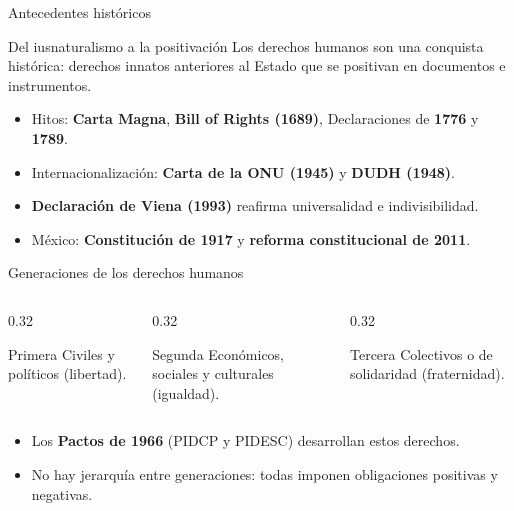 \documentclass[
  spanish,
  aspectratio=169,
  xcolor={dvipsnames,table}
]{beamer}
\begin{document}
\begin{frame}{Antecedentes históricos}
  \begin{block}{Del iusnaturalismo a la positivación}
    Los derechos humanos son una conquista histórica: derechos innatos anteriores al Estado que se positivan en documentos e instrumentos.
  \end{block}
  \begin{itemize}
    \item Hitos: \textbf{Carta Magna}, \textbf{Bill of Rights (1689)}, Declaraciones de \textbf{1776} y \textbf{1789}.
    \item Internacionalización: \textbf{Carta de la ONU (1945)} y \textbf{DUDH (1948)}.
    \item \textbf{Declaración de Viena (1993)} reafirma universalidad e indivisibilidad.
    \item México: \textbf{Constitución de 1917} y \textbf{reforma constitucional de 2011}.
  \end{itemize}
\end{frame}

\begin{frame}{Generaciones de los derechos humanos}
  \begin{columns}[T]
    \begin{column}{0.32\linewidth}
      \begin{block}{Primera}
        Civiles y políticos (libertad).
      \end{block}
    \end{column}
    \begin{column}{0.32\linewidth}
      \begin{block}{Segunda}
        Económicos, sociales y culturales (igualdad).
      \end{block}
    \end{column}
    \begin{column}{0.32\linewidth}
      \begin{block}{Tercera}
        Colectivos o de solidaridad (fraternidad).
      \end{block}
    \end{column}
  \end{columns}
  \vspace{0.25cm}
  \begin{itemize}
    \item Los \textbf{Pactos de 1966} (PIDCP y PIDESC) desarrollan estos derechos.
    \item No hay jerarquía entre generaciones: todas imponen obligaciones positivas y negativas.
  \end{itemize}
\end{frame}
\end{document}
